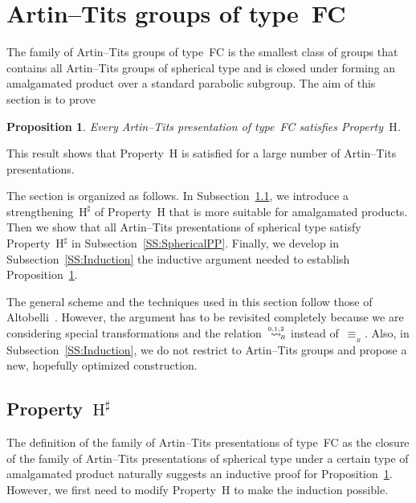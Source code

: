 \documentclass{amsart}
\numberwithin{equation}{section}
\theoremstyle{plain}
\newtheorem{prop}{Proposition}[section]
\theoremstyle{definition}
\begin{document}
\section{Artin--Tits groups of type~FC}
\label{S:FC}

The family of Artin--Tits groups of type~FC is the smallest class of groups that contains all Artin--Tits groups of spherical type and is closed under forming an amalgamated product over a standard parabolic subgroup. The aim of this section is to prove

\begin{prop}
\label{P:FC}
Every Artin--Tits presentation of type~FC satisfies Property~${\mathrm{H}}$.
\end{prop}

This result shows that Property~${\mathrm{H}}$ is satisfied for a large number of Artin--Tits presentations. 

The section is organized as follows. In Subsection~\ref{SS:Propp}, we introduce a strengthening~${{\mathrm{H}}^\sharp}$ of Property~${\mathrm{H}}$ that is more suitable for amalgamated products. Then we show that all Artin--Tits presentations of spherical type satisfy Property~${{\mathrm{H}}^\sharp}$ in Subsection~\ref{SS:SphericalPP}. Finally, we develop in Subsection~\ref{SS:Induction} the inductive argument needed to establish Proposition~\ref{P:FC}. 

The general scheme and the techniques used in this section follow those of Altobelli~\cite{Alt}. However, the argument has to be revisited completely because we are considering special transformations and the relation~${\mathrel{{\mathrel{\overset{\scriptscriptstyle 0,1,2}{\rightsquigarrow}}}_{\hspace{-0.9ex}{\scriptscriptstyle R}}}}$ instead of~${\equiv_{{\!{}_{R}}}}$. Also, in Subsection~\ref{SS:Induction}, we do not restrict to Artin--Tits groups and propose a new, hopefully optimized construction.

\subsection{Property~${{\mathrm{H}}^\sharp}$}
\label{SS:Propp}

The definition of the family of Artin--Tits presentations of type~FC as the closure of the family of Artin--Tits presentations of spherical type under a certain type of amalgamated product naturally suggests an inductive proof for Proposition~\ref{P:FC}. However, we first need to modify Property~${\mathrm{H}}$ to make the induction possible.
\end{document}
